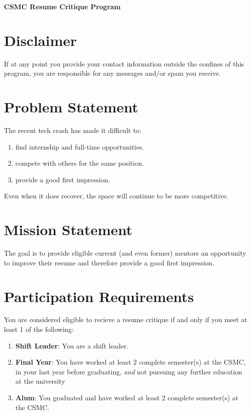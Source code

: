 \documentclass[letterpaper, 12pt]{article}
\newcommand{\minCompleteFinalYearSemeterRequirement}{2}
\begin{document}
\begin{center}
    \bfseries\Large CSMC Resume Critique Program
\end{center}

\section{Disclaimer}\label{section:disclaimer}

If at any point you provide your contact information outside the confines of
this program, you are responsible for any messages and/or spam you
receive.\label{section:disclaimer:spamMessages}

\section{Problem Statement}

The recent tech crash has made it difficult to:

\begin{enumerate}
    \item find internship and full-time opportunities.
    \item compete with others for the same position.
    \item provide a good first impression.
\end{enumerate}

Even when it does recover, the space will continue to be more competitive.

\section{Mission Statement}

The goal is to provide eligible current (and even former) mentors an opportunity
to improve their resume and therefore provide a good first impression.

\section{Participation Requirements}

You are considered eligible to recieve a resume critique if and only if you meet
at least 1 of the following:

\begin{enumerate}
    \item \textbf{Shift Leader}: You are a shift leader.
    \item \textbf{Final Year}: You have worked at least
        \minCompleteFinalYearSemeterRequirement{} complete semester(s) at the
        CSMC, in your last year before graduating, \textit{and} not pursuing any
        further education at the university
    \item \textbf{Alum}: You graduated and have worked at least
        \minCompleteFinalYearSemeterRequirement{} complete semester(s) at the
        CSMC.
\end{enumerate}
\end{document}
